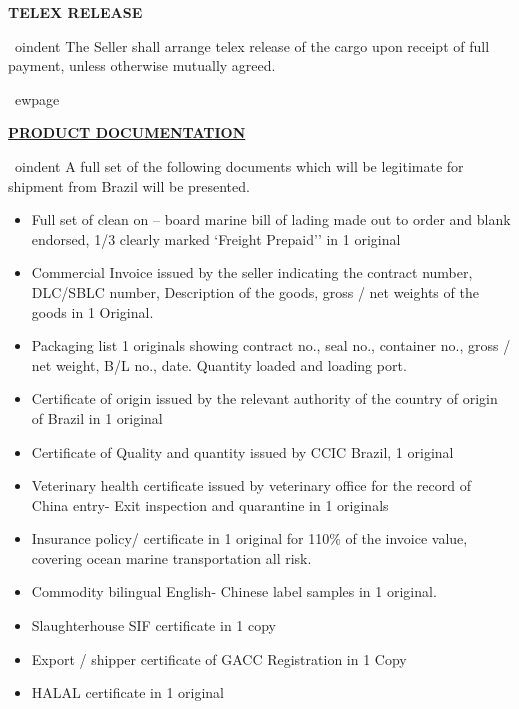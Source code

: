 \documentclass[a4paper,11pt]{article}
\begin{document}
\vspace{0.3cm}
\begin{center}{\large\textbf{\color{marooncolor}TELEX RELEASE}}\end{center}
\vspace{0.1cm}
\
oindent The Seller shall arrange telex release of the cargo upon receipt of full payment, unless otherwise mutually agreed.

\
ewpage

\begin{center}{\large\textbf{\underline{\color{marooncolor}PRODUCT DOCUMENTATION}}}\end{center}
\vspace{0.2cm}
\
oindent A full set of the following documents which will be legitimate for shipment from Brazil will be presented.
\vspace{0.1cm}
\begin{itemize}[leftmargin=1.5em, itemsep=3pt, topsep=2pt]
\item Full set of clean on -- board marine bill of lading made out to order and blank endorsed, 1/3 clearly marked `Freight Prepaid'' in 1 original
\item Commercial Invoice issued by the seller indicating the contract number, DLC/SBLC number, Description of the goods, gross / net weights of the goods in 1 Original.
\item Packaging list 1 originals showing contract no., seal no., container no., gross / net weight, B/L no., date. Quantity loaded and loading port.
\item Certificate of origin issued by the relevant authority of the country of origin of Brazil in 1 original
\item Certificate of Quality and quantity issued by CCIC Brazil, 1 original
\item Veterinary health certificate issued by veterinary office for the record of China entry- Exit inspection and quarantine in 1 originals
\item Insurance policy/ certificate in 1 original for 110\% of the invoice value, covering ocean marine transportation all risk.
\item Commodity bilingual English- Chinese label samples in 1 original.
\item Slaughterhouse SIF certificate in 1 copy
\item Export / shipper certificate of GACC Registration in 1 Copy
\item HALAL certificate in 1 original
\end{itemize}
\end{document}
